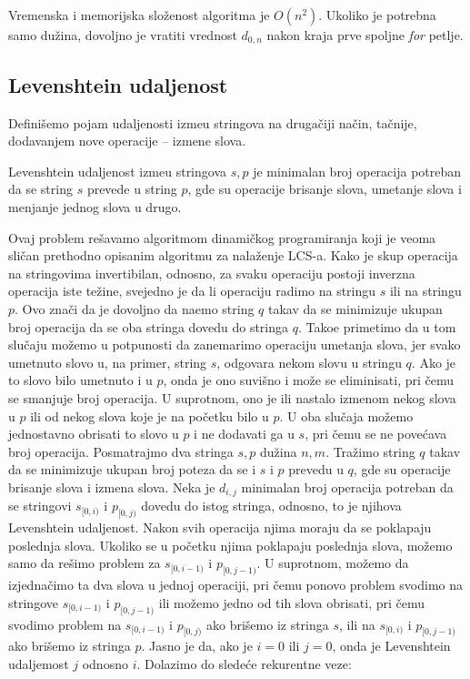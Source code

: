 Vremenska i memorijska slo\v zenost algoritma je $O(n^2)$. Ukoliko je potrebna samo du\v zina, dovoljno je vratiti vrednost $d_{0,n}$ nakon kraja prve spoljne \textit{for} petlje.

\subsection{Levenshtein udaljenost}

Defini\v semo pojam udaljenosti izme\dj u stringova na druga\v ciji na\v cin, ta\v cnije, dodavanjem nove operacije -- izmene slova.

\noindent
\begin{minipage}[l]{\textwidth}
\begin{dfn}
Levenshtein udaljenost izme\dj u stringova $s,p$ je minimalan broj operacija potreban da se string $s$ prevede u string $p$, gde su operacije brisanje slova, umetanje slova i menjanje jednog slova u drugo.
\end{dfn}
\end{minipage}

Ovaj problem re\v savamo algoritmom dinami\v ckog programiranja koji je veoma sli\v can prethodno opisanim algoritmu za nala\v zenje LCS-a. Kako je skup operacija na stringovima invertibilan, odnosno, za svaku operaciju postoji inverzna operacija iste te\v zine, svejedno je da li operaciju radimo na stringu $s$ ili na stringu $p$. Ovo zna\v ci da je dovoljno da na\dj emo string $q$ takav da se minimizuje ukupan broj operacija da se oba stringa dovedu do stringa $q$. Tako\dj e primetimo da u tom slu\v caju mo\v zemo u potpunosti da zanemarimo operaciju umetanja slova, jer svako umetnuto slovo u, na primer, string $s$, odgovara nekom slovu u stringu $q$. Ako je to slovo bilo umetnuto i u $p$, onda je ono suvi\v sno i mo\v ze se eliminisati, pri \v cemu se smanjuje broj operacija. U suprotnom, ono je ili nastalo izmenom nekog slova u $p$ ili od nekog slova koje je na po\v cetku bilo u $p$. U oba slu\v caja mo\v zemo jednostavno obrisati to slovo u $p$ i ne dodavati ga u $s$, pri \v cemu se ne pove\' cava broj operacija. Posmatrajmo dva stringa $s,p$ du\v zina $n,m$. Tra\v zimo string $q$ takav da se minimizuje ukupan broj poteza da se i $s$ i $p$ prevedu u $q$, gde su operacije brisanje slova i izmena slova. Neka je $d_{i,j}$ minimalan broj operacija potreban da se stringovi $s_{[0,i)}$ i $p_{[0,j)}$ dovedu do istog stringa, odnosno, to je njihova Levenshtein udaljenost. Nakon svih operacija njima moraju da se poklapaju poslednja slova. Ukoliko se u po\v cetku njima poklapaju poslednja slova, mo\v zemo samo da re\v simo problem za $s_{[0,i-1)}$ i $p_{[0,j-1)}$. U suprotnom, mo\v zemo da izjedna\v cimo ta dva slova u jednoj operaciji, pri \v cemu ponovo problem svodimo na stringove $s_{[0,i-1)}$ i $p_{[0,j-1)}$ ili mo\v zemo jedno od tih slova obrisati, pri \v cemu svodimo problem na $s_{[0,i-1)}$ i $p_{[0,j)}$ ako bri\v semo iz stringa $s$, ili na $s_{[0,i)}$ i $p_{[0,j-1)}$ ako bri\v semo iz stringa $p$. Jasno je da, ako je $i=0$ ili $j=0$, onda je Levenshtein udaljemost $j$ odnosno $i$. Dolazimo do slede\' ce rekurentne veze:

